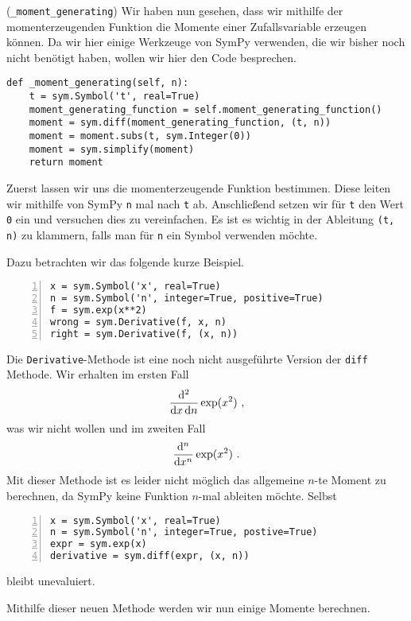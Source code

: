 \begin{Code}{(\lstinline|_moment_generating|)}
\hypertarget{Code:n_Moment_Generating}{}Wir haben nun gesehen, dass wir mithilfe der momenterzeugenden Funktion die Momente einer Zufallsvariable erzeugen können. Da wir hier einige Werkzeuge von SymPy verwenden, die wir bisher noch nicht benötigt haben, wollen wir hier den Code besprechen.
\begin{lstlisting}
def _moment_generating(self, n):
    t = sym.Symbol('t', real=True)
    moment_generating_function = self.moment_generating_function()
    moment = sym.diff(moment_generating_function, (t, n))
    moment = moment.subs(t, sym.Integer(0))
    moment = sym.simplify(moment)
    return moment
\end{lstlisting}
Zuerst lassen wir uns die momenterzeugende Funktion bestimmen. Diese leiten wir mithilfe von SymPy  \lstinline|n| mal nach \lstinline|t| ab. Anschließend setzen wir für \lstinline|t| den Wert \lstinline|0| ein und versuchen dies zu vereinfachen. Es ist es wichtig in der Ableitung \lstinline|(t, n)| zu klammern, falls man für \lstinline|n| ein Symbol verwenden möchte.

\newpage

Dazu betrachten wir das folgende kurze Beispiel.
\begin{lstlisting}[numbers=left, numberstyle=\tiny\color{codegray}]
x = sym.Symbol('x', real=True)
n = sym.Symbol('n', integer=True, positive=True)
f = sym.exp(x**2)
wrong = sym.Derivative(f, x, n)
right = sym.Derivative(f, (x, n))
\end{lstlisting}
Die \lstinline|Derivative|-Methode ist eine noch nicht ausgeführte Version der \lstinline|diff| Methode. Wir erhalten im ersten Fall
\[\frac{\mathop{}\!\mathrm{d}^2}{\mathop{}\!\mathrm{d} x \mathop{}\!\mathrm{d} n} \exp(x^2)~,\]
was wir nicht wollen und im zweiten Fall
\[\frac{\mathop{}\!\mathrm{d}^n}{\mathop{}\!\mathrm{d} x^n} \exp(x^2)~.\] 
Mit dieser Methode ist es leider nicht möglich das allgemeine $n$-te Moment zu berechnen, da SymPy  keine Funktion $n$-mal ableiten möchte. Selbst
\begin{lstlisting}[numbers=left, numberstyle=\tiny\color{codegray}]
x = sym.Symbol('x', real=True)
n = sym.Symbol('n', integer=True, postive=True)
expr = sym.exp(x)
derivative = sym.diff(expr, (x, n))
\end{lstlisting}
bleibt unevaluiert.
\end{Code}

Mithilfe dieser neuen Methode werden wir nun einige Momente berechnen.

